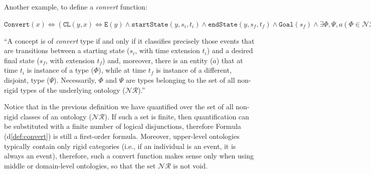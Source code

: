 \documentclass[sw]{iosart2x}
\newcommand{\bflist}{\begin{list}{}{\setlength{\topsep}{2mm}\setlength{\partopsep}{0mm}\setlength{\parsep}{0mm}\setlength{\leftmargin}{9mm}\setlength{\labelwidth}{8mm}}}
\newcommand{\eflist}{\end{list}}
\newcommand{\DefLabel}{\textrm{d}}
\newcounter{cntdef}
\newcommand{\mydf}[1]{\refstepcounter{cntdef}\begin{small}{\bf \DefLabel\thecntdef\label{def:#1}}\end{small}}
\newcommand{\mytext}[1]{``#1''}
\newcommand{\refdf}[1]{({\DefLabel}\ref{#1})}
\newcommand{\generalStyle}[1]{\texttt{#1}}
\newcommand{\biRel}[3]{\generalStyle{#1}(#2,#3)}
\newcommand{\uniRel}[2]{\generalStyle{#1}(#2)}
\newcommand{\triRel}[4]{\generalStyle{#1}(#2,#3,#4)}
\newcommand{\myiff}{\Longleftrightarrow}
\newcommand{\DOLCEEvent}[1]{\uniRel{{E}}{#1}}
\newcommand{\DOLCEPC}[3]{\triRel{{PC}}{#1}{#2}{#3}}
\newcommand{\DOLCECLbyBinary}[2]{\biRel{CL}{#1}{#2}}
\newcommand{\Goal}[1]{\uniRel{Goal}{#1}}
\newcommand{\Convert}[1]{\uniRel{Convert}{#1}}
\newcommand{\sState}[3]{\triRel{startState}{#1}{#2}{#3}}
\newcommand{\eState}[3]{\triRel{endState}{#1}{#2}{#3}}
\begin{document}
Another example, to define a \textit{convert} function: 
\bflist
  \item[\mydf{convert}] $ \Convert{x} \myiff (\DOLCECLbyBinary{y}{x} \myiff \DOLCEEvent{y} \land \sState{y}{s_i}{t_i} \land \eState{y}{s_f}{t_f} \land \Goal{s_f} \land \exists \Phi,\Psi,a (\Phi\in\mathcal{NR} \land \Psi\in\mathcal{NR} \land \Psi\cap\Phi = \emptyset \land  \DOLCEPC{a}{s_i}{t_i} \land \DOLCEPC{a}{s_f}{t_f} \land \Phi(a,t_i) \land \Psi(a,t_f))) $ 
  \item[] \mytext{A concept is of \textit{convert} type if and only if it classifies precisely those events that are transitions between a starting state ($s_i$, with time extension $t_i$) and a desired final state ($s_f$, with extension $t_f$) and, moreover, there is an entity ($a$) that at time $t_i$ is instance of a type ($\Phi$), while at time $t_f$ is instance of a different, disjoint, type ($\Psi$). Necessarily, $\Phi$ and $\Psi$ are types belonging to the set of all non-rigid types of the underlying ontology ($\mathcal{NR}$).}
\eflist 
Notice that in the previous definition we have quantified over the set of all non-rigid classes of an ontology ($\mathcal{NR}$). 
If such a set is finite, then quantification can be substituted with a finite number of logical disjunctions, therefore Formula \refdf{def:convert} is still a first-order formula.
Moreover, upper-level ontologies typically contain only rigid categories (i.e., if an individual is an event, it is always an event), therefore, such a convert function makes sense only when using middle or domain-level ontologies, so that the set $\mathcal{NR}$ is not void.     
\end{document}
